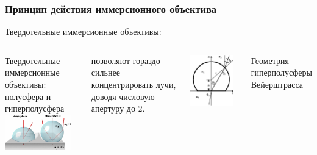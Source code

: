 \documentclass[9pt, compress, xcolor=table]{beamer}
\begin{document}
\begin{frame}[fragile]\frametitle{Принцип действия иммерсионного объектива}
\textcolor{Mycolor1}{Твердотельные иммерсионные объективы:}
\begin{columns}[c]
\column{6cm}
Твердотельные иммерсионные объективы: полусфера и гиперполусфера
\\
\includegraphics[width=0.9\textwidth]{wl_1}

позволяют гораздо сильнее концентрировать лучи, доводя числовую апертуру до 2.

\column{6cm}
\includegraphics[width=0.9\textwidth]{wl_2}

Геометрия гиперполусферы Вейерштрасса
\end{columns}

\end{frame}
\end{document}
